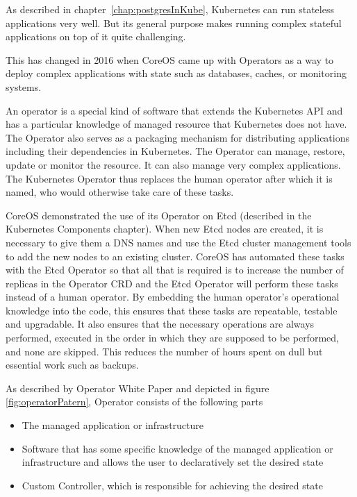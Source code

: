 \pagebreak
{}
\label{chap:operators}
As described in chapter~\ref{chap:postgresInKube}, Kubernetes can run stateless applications very well. But its general purpose makes running complex stateful applications on top of it quite challenging.


This has changed in 2016 when CoreOS came up with Operators as a way to deploy complex applications with state such as databases, caches, or monitoring systems. \cite{IArchiveCOSOperators}

An operator is a special kind of software that extends the Kubernetes API and has a particular knowledge of managed resource that Kubernetes does not have. The Operator also serves as a packaging mechanism for distributing applications including their dependencies in Kubernetes. The Operator can manage, restore, update or monitor the resource. It can also manage very complex applications. The Kubernetes Operator thus replaces the human operator after which it is named, who would otherwise take care of these tasks. \cite{OperatorsPreface} \cite{IArchiveCOSOperators}


CoreOS demonstrated the use of its Operator on Etcd (described in the Kubernetes Components chapter). When new Etcd nodes are created, it is necessary to give them a DNS names and use the Etcd cluster management tools to add the new nodes to an existing cluster. CoreOS has automated these tasks with the Etcd Operator so that all that is required is to increase the number of replicas in the Operator CRD and the Etcd Operator will perform these tasks instead of a human operator. \cite{IArchiveCOSOperators}
By embedding the human operator's operational knowledge into the code, this ensures that these tasks are repeatable, testable and upgradable. It also ensures that the necessary operations are always performed, executed in the order in which they are supposed to be performed, and none are skipped. This reduces the number of hours spent on dull but essential work such as backups. \cite{OperatorWhitepaper}

As described by Operator White Paper \cite{OperatorWhitepaper} and depicted in figure \ref{fig:operatorPatern}, Operator consists of the following parts
\begin{itemize}
    \item The managed application or infrastructure
    \item Software that has some specific knowledge of the managed application or infrastructure and allows the user to declaratively set the desired state
    \item Custom Controller, which is responsible for achieving the desired state
\end{itemize}

